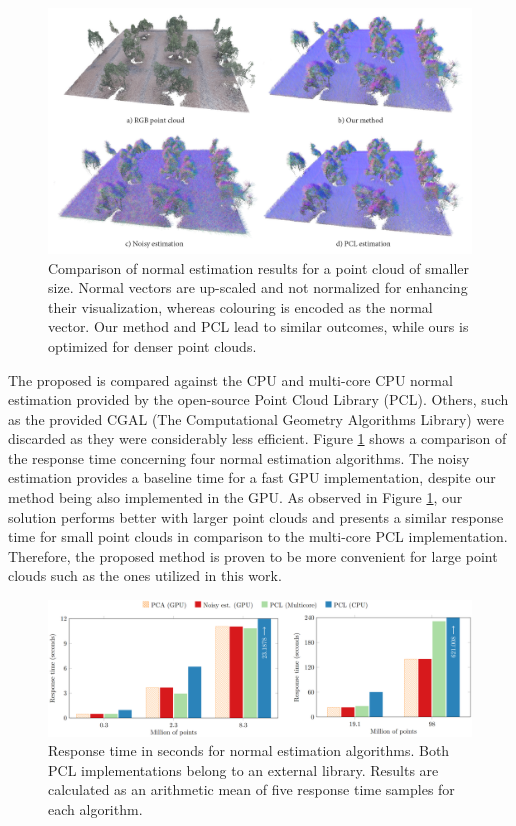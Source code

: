 \begin{figure} 
    \centering
    \includegraphics[width=\linewidth]{figs/thermal_projection/normal_estimation.png}
	\caption{Comparison of normal estimation results for a point cloud of smaller size. Normal vectors are up-scaled and not normalized for enhancing their visualization, whereas colouring is encoded as the normal vector. Our method and PCL lead to similar outcomes, while ours is optimized for denser point clouds.}
	\label{fig:thermal_normal_estimation}
\end{figure}

The proposed is compared against the CPU and multi-core CPU normal estimation provided by the open-source Point Cloud Library (PCL). Others, such as the provided CGAL (The Computational Geometry Algorithms Library) were discarded as they were considerably less efficient. Figure \ref{fig:thermal_normal_estimation} shows a comparison of the response time concerning four normal estimation algorithms. The noisy estimation provides a baseline time for a fast GPU implementation, despite our method being also implemented in the GPU. As observed in Figure \ref{fig:thermal_normal_estimation}, our solution performs better with larger point clouds and presents a similar response time for small point clouds in comparison to the multi-core PCL implementation. Therefore, the proposed method is proven to be more convenient for large point clouds such as the ones utilized in this work.

\begin{figure}
    \centering
    \includegraphics[width=\linewidth]{figs/thermal_projection/response_time_normals.png}
    \caption{Response time in seconds for normal estimation algorithms. Both PCL implementations belong to an external library. Results are calculated as an arithmetic mean of five response time samples for each algorithm. }
	\label{fig:thermal_normal_response_time}
\end{figure}


